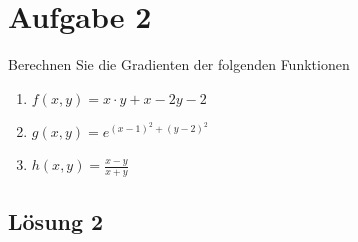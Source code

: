 \documentclass[main.tex]{subfiles}
\begin{document}
\section{Aufgabe 2}
Berechnen Sie die Gradienten der folgenden Funktionen

\begin{enumerate}
    \item $f(x,y) = x \cdot y + x - 2y -2$
    \item $g(x,y) = e^{(x-1)^2 + (y-2)^2}$
    \item $h(x,y) = \frac{x-y}{x+y}$
\end{enumerate}

\subsection{Lösung 2}
\end{document}
